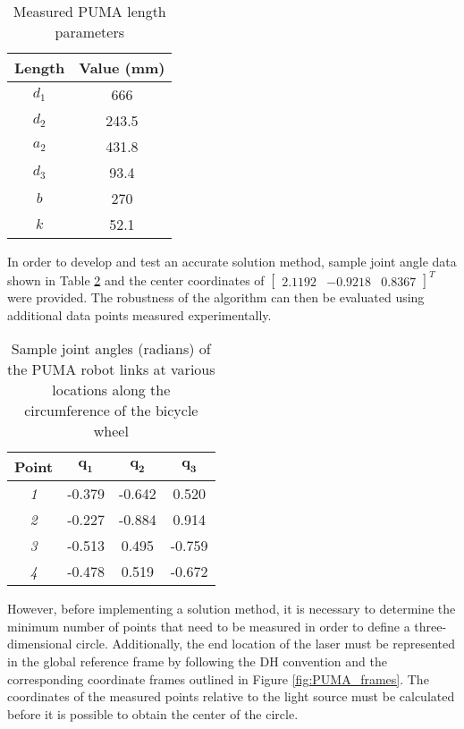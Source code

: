 \documentclass[12pt]{article}
\begin{document}
\begin{table}[ht!]
\begin{center}
\begin{tabular}{|c|c|}
\hline
\textbf{Length} & \textbf{Value (mm)} \\ \hline
$d_1$     & 666        \\ \hline
$d_2$     & 243.5      \\ \hline
$a_2$     & 431.8      \\ \hline
$d_3$     & 93.4       \\ \hline
$b$      & 270        \\ \hline
$k$      & 52.1       \\ \hline
\end{tabular}
\caption{Measured PUMA length parameters}
\label{tab:PUMA_lengths}
\end{center}
\end{table}
\noindent
In order to develop and test an accurate solution method, sample joint angle data shown in Table \ref{tab:sample_data} and the center coordinates of $\begin{bmatrix} 2.1192 & -0.9218  & 0.8367 \end{bmatrix}^T$ were provided. The robustness of the algorithm can then be evaluated using additional data points measured experimentally.    

\begin{table}[ht!]
\begin{center}
\begin{tabular}{|c|c|c|c|}
\hline
\textbf{Point} & $\boldsymbol{q_1}$    & $\boldsymbol{q_2}$     & $\boldsymbol{q_3}$     \\ \hline
\it{1}     & -0.379 & -0.642 & 0.520  \\ \hline
\it{2}     & -0.227 & -0.884 & 0.914  \\ \hline
\it{3}     & -0.513 & 0.495  & -0.759 \\ \hline
\it{4}     & -0.478 & 0.519  & -0.672 \\ \hline
\end{tabular}
\caption{Sample joint angles (radians) of the PUMA robot links at various locations along the circumference of the bicycle wheel}
\label{tab:sample_data}
\end{center}
\end{table}

However, before implementing a solution method, it is necessary to determine the minimum number of points that need to be measured in order to define a three-dimensional circle. Additionally, the end location of the laser must be represented in the global reference frame by following the DH convention and the corresponding coordinate frames outlined in Figure \ref{fig:PUMA_frames}. The coordinates of the measured points relative to the light source must be calculated before it is possible to obtain the center of the circle.
 
\end{document}
